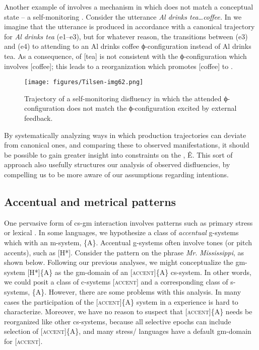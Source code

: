   Another example of  involves a mechanism in which  does not match a conceptual state -- a self-monitoring . Consider the utterance \textit{Al drinks tea…coffee.} In {} we imagine that the utterance is produced in accordance with a canonical trajectory for \textit{Al drinks tea} (e1--e3), but for whatever reason, the  transitions between (e3) and (e4) to attending to an {\textbar}Al drinks coffee{\textbar} ϕ-configuration instead of {\textbar}Al drinks tea{\textbar}. As a consequence,  of [tea] is not consistent with the ϕ-configuration which involves [coffee]; this leads to a reorganization which promotes [coffee] to .

  
\begin{figure}
\texttt{[image: figures/Tilsen-img62.png]}
\caption{Trajectory of a self-monitoring disfluency in which the attended ϕ-configuration does not match the ϕ-configuration excited by external feedback.}
\label{fig:4:12}
\end{figure}
 

  By systematically analyzing ways in which production trajectories can deviate from canonical ones, and comparing these to observed manifestations, it should be possible to gain greater insight into constraints on the , Ê. This sort of approach also usefully structures our analysis of observed disfluencies, by compelling us to be more aware of our assumptions regarding  intentions.

\subsection{Accentual and metrical patterns}

One pervasive form of cs-gm interaction involves  patterns such as primary stress or lexical . In some languages, we hypothesize a class of \textit{accentual} g-systems which  with an  m-sys\-tem, \{A\}. Accentual g-systems often involve tones (or pitch accents), such as [H*]. Consider the  pattern on the phrase \textit{Mr}. \textit{Mississippi}, as shown below. Following our previous analyses, we might conceptualize the gm-sys\-tem [H*]\{A\} as the gm-domain of an  [\textsc{accent}]\{A\} cs-system. In other words, we could posit a class of  c-systems [\textsc{accent}] and a corresponding class of s-systems, \{A\}. However, there are some problems with this analysis. In many cases the participation of the [\textsc{accent}]\{A\} system in a  experience is hard to characterize. Moreover, we have no reason to suspect that [\textsc{accent}]\{A\} needs be reorganized like other cs-systems, because all selective epochs can include selection of [\textsc{accent}]\{A\}, and many stress/ languages have a default gm-domain for [\textsc{accent}].

